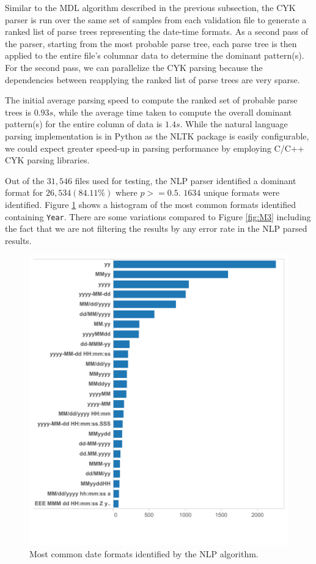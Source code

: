 Similar to the MDL algorithm described in the previous subsection, the CYK parser is run over the same set of samples from each validation file to generate a ranked list of parse trees representing the date-time formats. As a second pass of the parser, starting from the most probable parse tree, each parse tree is then applied to the entire file's columnar data to determine the dominant pattern(s). For the second pass, we can parallelize the CYK parsing because the dependencies between reapplying the ranked list of parse trees are very sparse.

The initial average parsing speed to compute the ranked set of probable parse trees is $0.93s$, while the average time taken to compute the overall dominant pattern(s) for the entire column of data is $1.4s$. While the natural language parsing implementation is in Python as the NLTK package is easily configurable, we could expect greater speed-up in parsing performance by employing C/C++ CYK parsing libraries.


Out of the $31,546$ files used for testing, the NLP parser identified a dominant format for $26, 534 (84.11\%)$ where $p >= 0.5$. $1634$ unique formats were identified. Figure \ref{fig:NLP1} shows a histogram of the most common formats identified containing \texttt{Year}. There are some variations compared to Figure \ref{fig:M3} including the fact that we are not filtering the results by any error rate in the NLP parsed results.

\begin{figure}[ht]
\centering
\includegraphics[width=\columnwidth]{figures/FigureNLP1}
\caption{Most common date formats identified by the NLP algorithm.}
\label{fig:NLP1}
\end{figure}

